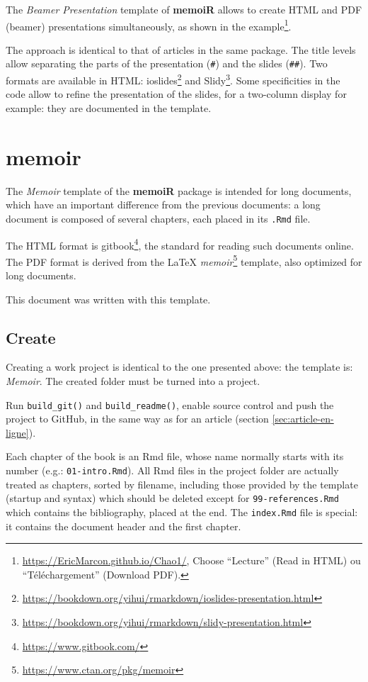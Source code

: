 \documentclass[
  12pt,
  american,
  a4paper,
  extrafontsizes,onecolumn,openright
  ]{memoir}
\begin{document}
The \emph{Beamer Presentation} template of \textbf{memoiR} allows to create HTML and PDF (beamer) presentations simultaneously, as shown in the example\footnote{\url{https://EricMarcon.github.io/Chao1/}, Choose \enquote{Lecture} (Read in HTML) ou \enquote{Téléchargement} (Download PDF).}.

The approach is identical to that of articles in the same package.
The title levels allow separating the parts of the presentation (\texttt{\#}) and the slides (\texttt{\#\#}).
Two formats are available in HTML: ioslides\footnote{\url{https://bookdown.org/yihui/rmarkdown/ioslides-presentation.html}} and Slidy\footnote{\url{https://bookdown.org/yihui/rmarkdown/slidy-presentation.html}}.
Some specificities in the code allow to refine the presentation of the slides, for a two-column display for example: they are documented in the template.

\section{memoir}\label{memoir}

The \emph{Memoir} template of the \textbf{memoiR} package is intended for long documents, which have an important difference from the previous documents: a long document is composed of several chapters, each placed in its \texttt{.Rmd} file.

The HTML format is gitbook\footnote{\url{https://www.gitbook.com/}}, the standard for reading such documents online.
The PDF format is derived from the LaTeX \emph{memoir}\footnote{\url{https://www.ctan.org/pkg/memoir}} template, also optimized for long documents.

This document was written with this template.

\subsection{Create}\label{create-1}

Creating a work project is identical to the one presented above: the template is: \emph{Memoir}.
The created folder must be turned into a project.

Run \texttt{build\_git()} and \texttt{build\_readme()}, enable source control and push the project to GitHub, in the same way as for an article (section \ref{sec:article-en-ligne}).

Each chapter of the book is an Rmd file, whose name normally starts with its number (e.g.: \texttt{01-intro.Rmd}).
All Rmd files in the project folder are actually treated as chapters, sorted by filename, including those provided by the template (startup and syntax) which should be deleted except for \texttt{99-references.Rmd} which contains the bibliography, placed at the end.
The \texttt{index.Rmd} file is special: it contains the document header and the first chapter.
\end{document}
